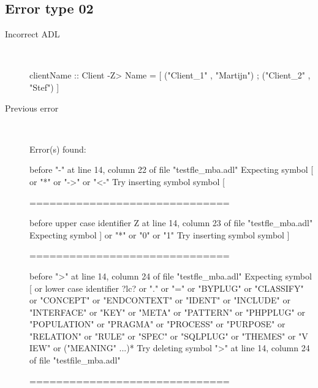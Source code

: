 \hrulefill

\subsection{Error type 02}
  \begin{description}
  \item[Incorrect ADL]~\\
\begin{adl}
clientName :: Client -Z> Name =
    [ ("Client_1"      , "Martijn")
    ; ("Client_2"      , "Stef")
    ]
\end{adl}
  \item[Previous error]~\\
\begin{haskell}
Error(s) found:

before "-" at line 14, column 22 of file "testfle_mba.adl"
Expecting symbol [ or "*" or "->" or "<-"
Try inserting symbol symbol [

==============================

before upper case identifier Z at line 14, column 23 of file "testfle_mba.adl"
Expecting symbol ] or "*" or "0" or "1"
Try inserting symbol symbol ]

==============================

before ">" at line 14, column 24 of file "testfle_mba.adl"
Expecting symbol [ or lower case identifier ?lc? or "." or "=" or "BYPLUG" or "CLASSIFY" or "CONCEPT" or "ENDCONTEXT" or "IDENT" or "INCLUDE" or "INTERFACE" or
"KEY" or "META" or "PATTERN" or "PHPPLUG" or "POPULATION" or "PRAGMA" or "PROCESS" or "PURPOSE" or "RELATION" or "RULE" or "SPEC" or "SQLPLUG" or "THEMES" or "V
IEW" or ("MEANING" ...)*
Try deleting symbol ">" at line 14, column 24 of file "testfile_mba.adl"

==============================


\end{haskell}
\end{description}
